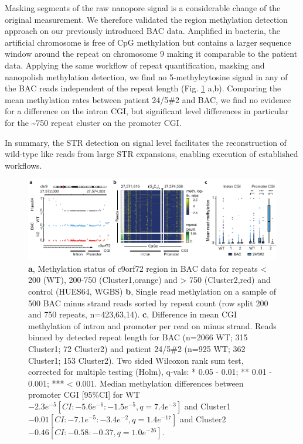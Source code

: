 Masking segments of the raw nanopore signal is a considerable change of the original measurement. We therefore validated the region methylation detection approach on our previously introduced BAC data. Amplified in bacteria, the artificial chromosome is free of CpG methylation but contains a larger sequence window around the repeat on chromosome 9 making it comparable to the patient data. Applying the same workflow of repeat quantification, masking and nanopolish methylation detection, we find no 5-methylcytosine signal in any of the BAC reads independent of the repeat length (Fig. \ref{fig:strique:methylation_bac_region} a,b). Comparing the mean methylation rates between patient 24/5\#2 and BAC, we find no evidence for a difference on the intron CGI, but significant level differences in particular for the \textasciitilde750 repeat cluster on the promoter CGI.

In summary, the STR detection on signal level facilitates the reconstruction of wild-type like reads from large STR expansions, enabling execution of established workflows.

\begin{figure}[h]
    \centering
    \includegraphics[width=1.0\textwidth]{figures/strique/methylation_bac_region.pdf}
    \captionsetup{format=plain}
    \caption[Nanopore single read methylation in BAC data]{\textbf{a}, Methylation status of c9orf72 region in BAC data for repeats < 200 (WT), 200-750 (Cluster1,orange) and > 750 (Cluster2,red) and control (HUES64, WGBS) \textbf{b}, Single read methylation on a sample of 500 BAC minus strand reads sorted by repeat count (row split 200 and 750 repeats, n=423,63,14). \textbf{c}, Difference in mean CGI methylation of intron and promoter per read on minus strand. Reads binned by detected repeat length for BAC (n=2066 WT; 315 Cluster1; 72 Cluster2) and patient 24/5\#2 (n=925 WT; 362 Cluster1; 153 Cluster2). Two sided Wilcoxon rank sum test, corrected for multiple testing (Holm), q-vals: * 0.05 - 0.01; ** 0.01 - 0.001; *** < 0.001. Median methylation differences between promoter CGI [95\%CI] for WT $-2.3e^{-5} [CI: -5.6e^{-6}:-1.5e^{-5}, q=7.4e^{-3}] $ and Cluster1 $ -0.01 [CI: -7.1e^{-5}:-3.4e^{-2}, q=1.4e^{-17}] $ and Cluster2 $ -0.46 [CI: -0.58:-0.37, q=1.0e^{-26}] $.}
    \label{fig:strique:methylation_bac_region}
\end{figure}




